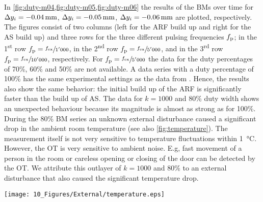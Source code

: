 In \cref{fig:duty-m04,fig:duty-m05,fig:duty-m06} the results of the BMs over 
time for $\Dy_{i}=\SI{-0.04}{\mm}$, $\Dy_{i}=\SI{-0.05}{\mm}$, 
$\Dy_{i}=\SI{-0.06}{\mm}$ are plotted, respectively. The figures consist of two 
columns (left for the ARF build up and right for the AS build up) and three 
rows for the three different pulsing frequencies $f_{\mathrm{p}}$; in the 
1\textsuperscript{st} row $f_{\mathrm{p}}=\sfrac{f_{\mathrm{ex}}}{1'000}$, in the 
2\textsuperscript{nd} row $f_{\mathrm{p}}=\sfrac{f_{\mathrm{ex}}}{5'000}$, and in the 
3\textsuperscript{rd} row $f_{\mathrm{p}}=\sfrac{f_{\mathrm{ex}}}{10'000}$, respectively. For 
$f_{\mathrm{p}}=\sfrac{f_{\mathrm{ex}}}{5'000}$ the data for the duty percentages of 70\%, 60\% and 
50\% are not available. A data series with a duty percentage of 100\% has the 
same experimental settings as the data from \cite{Goering2021}. Hence, the 
results also show the same behavior: the initial build up of the ARF is 
significantly faster than the build up of AS. The data for $k=1000$ and 80\% 
duty width shows an unexpected behaviour because its magnitude is almost as 
strong as for 100\%.  During the 80\% BM series an unknown external disturbance 
caused a significant drop in the ambient room temperature (see also 
\cref{fig:temperature}). The measurement itself is not very sensitive to 
temperature fluctuations within \SI{1}{\degreeCelsius}.  However, the OT is 
very sensitive to ambient noise.  E.g, fast movement of a person in the room or 
careless opening or closing of the door can be detected by the OT.  We 
attribute this outlayer of $k=1000$ and 80\% to an external disturbance that 
also caused the significant temperature drop.

\begin{figure*}[tbp]
  \centering
  \texttt{[image: 10\_Figures/External/temperature.eps]}
  \caption{Ambient temperature $T$ at device for $k = 1000$ BM series over 
  time.  The experiment of 80\% occurred between 14:00 and 15:00 (gray shaded 
area).}\label{fig:temperature}
\end{figure*}

